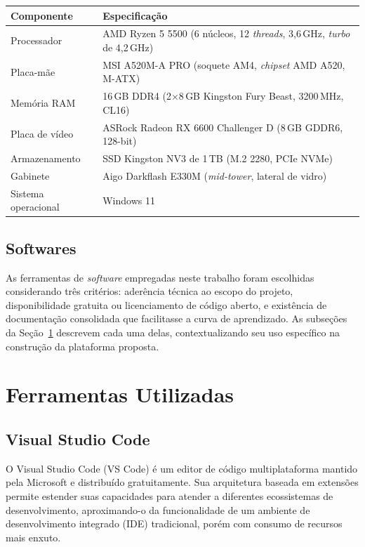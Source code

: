 \begin{quadro}[h!]
\caption{Configuração do equipamento utilizado no desenvolvimento}
\label{quad:equipamento}
\begin{tabular}{|p{4cm}|p{11cm}|}
\hline
\textbf{Componente} & \textbf{Especificação} \\ \hline
Processador & AMD Ryzen 5 5500 (6 núcleos, 12 \textit{threads}, 3,6\,GHz, \textit{turbo} de 4,2\,GHz) \\ \hline
Placa-mãe & MSI A520M-A PRO (soquete AM4, \textit{chipset} AMD A520, M-ATX) \\ \hline
Memória RAM & 16\,GB DDR4 (2$\times$8\,GB Kingston Fury Beast, 3200\,MHz, CL16) \\ \hline
Placa de vídeo & ASRock Radeon RX 6600 Challenger D (8\,GB GDDR6, 128-bit) \\ \hline
Armazenamento & SSD Kingston NV3 de 1\,TB (M.2 2280, PCIe NVMe) \\ \hline
Gabinete & Aigo Darkflash E330M (\textit{mid-tower}, lateral de vidro) \\ \hline
Sistema operacional & Windows 11 \\ \hline
\end{tabular}
\end{quadro}

\subsection{Softwares}

As ferramentas de \textit{software} empregadas neste trabalho foram escolhidas considerando três critérios: aderência técnica ao escopo do projeto, disponibilidade gratuita ou licenciamento de código aberto, e existência de documentação consolidada que facilitasse a curva de aprendizado. As subseções da Seção~\ref{sec:ferramentas} descrevem cada uma delas, contextualizando seu uso específico na construção da plataforma proposta.

\section{Ferramentas Utilizadas}
\label{sec:ferramentas}

\subsection{Visual Studio Code}

O Visual Studio Code (VS Code) é um editor de código multiplataforma mantido pela Microsoft e distribuído gratuitamente. Sua arquitetura baseada em extensões permite estender suas capacidades para atender a diferentes ecossistemas de desenvolvimento, aproximando-o da funcionalidade de um ambiente de desenvolvimento integrado (IDE) tradicional, porém com consumo de recursos mais enxuto.

